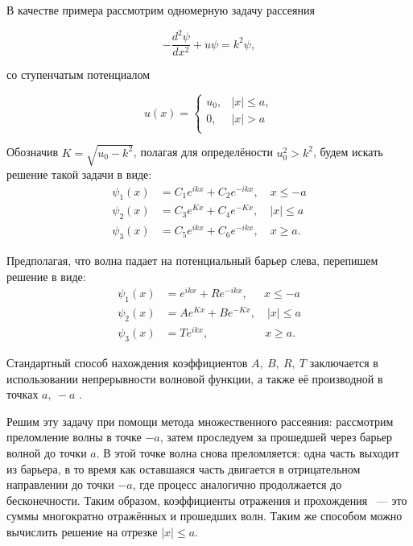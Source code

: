 \documentclass[a4 paper, 12 pt]{extarticle}
\begin{document}
   В качестве примера рассмотрим одномерную задачу рассеяния

   \begin{equation}\label{ScattPrBarr}
   -\frac{d^2\psi}{d x^2}+u\psi=k^2\psi,
   \end{equation}

   \pagebreak
   со ступенчатым потенциалом

   \begin{equation*}\label{BarrierPot}
   u(x)=\left\{%
   \begin{array}{ll}
   u_0, & |x|\leq a, \\
   0, & |x|>a \\
   \end{array}%
   \right.
   \end{equation*}

   Обозначив $K = \sqrt{u_0-k^2}$, полагая для определёности $u_0^2 > k^2$, будем искать решение такой задачи в виде:
   \[\begin{split}
   \psi_1\left(x\right) &= C_1 e^{ikx} + C_2 e^{-ikx}, \quad x\leq -a\\
   \psi_2\left(x\right) &= C_3 e^{Kx} + C_4 e^{-Kx}, \quad \left|x\right|\leq a\\
   \psi_3\left(x\right) &= C_5 e^{ikx} + C_6 e^{-ikx}, \quad x \geq a.
   \end{split}\]

   Предполагая, что волна падает на потенциальный барьер слева, перепишем решение в виде:
   \[\begin{split}
   \psi_1\left(x\right) &= e^{ikx} + R e^{-ikx}, \quad \ \ x\leq -a\\
   \psi_2\left(x\right) &= Ae^{Kx} + B e^{-Kx}, \quad \left|x\right|\leq a\\
   \psi_3\left(x\right) &= T e^{ikx}, \quad \quad \quad \quad \quad x \geq a.
   \end{split}\]

   Стандартный способ нахождения коэффициентов $A,\  B, \  R,\  T$  заключается в использовании непрерывности волновой функции, а также её производной в точках $a, \ -a$ \cite{Peisakhovich}.

   Решим эту задачу при помощи метода множественного рассеяния: рассмотрим преломление волны в точке $-a$, затем проследуем за прошедшей через барьер волной до точки $a$. В этой точке волна снова преломляется: одна часть выходит из барьера, в то время как оставшаяся часть двигается в отрицательном направлении до точки $-a$, где процесс аналогично продолжается до бесконечности. Таким образом, коэффициенты отражения и прохождения ~--- это суммы многократно отражённых и прошедших волн. Таким же способом можно вычислить решение на отрезке $\left|x\right|\leq a$.
\end{document}
